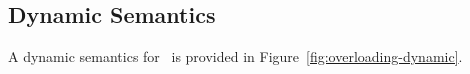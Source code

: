 %
%
%
%

\subsection{Dynamic Semantics}\label{overloading-dynamic}
A dynamic semantics for \overloadingcore\ is provided in
Figure~\ref{fig:overloading-dynamic}.


